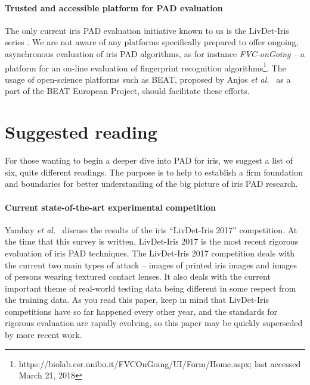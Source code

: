 \documentclass[format=acmsmall, review=false, timestamp=false]{acmart}
\newcommand{\etal}{{\it et al.}~}
\begin{document}
\paragraph{Trusted and accessible platform for PAD evaluation}

The only current iris PAD evaluation initiative known to us is the LivDet-Iris series \cite{Yambay_IJCB_2014,Yambay_ISBA_2017,Yambay_IJCB_2017}. We are not aware of any platforms specifically prepared to offer ongoing, asynchronous evaluation of iris PAD algorithms, as for instance {\it FVC-onGoing} -- a platform for an on-line evaluation of fingerprint recognition algorithms\footnote{https://biolab.csr.unibo.it/FVCOnGoing/UI/Form/Home.aspx; last accessed March 21, 2018}. The usage of open-science platforms such as BEAT, proposed by Anjos \etal \cite{Anjos_arXiv_2017} as a part of the BEAT European Project, should facilitate these efforts.

\section{Suggested reading}
\label{sec:SuggestedReading}

For those wanting to begin a deeper dive into PAD for iris, we suggest a list of six{, quite different} readings. The purpose is to help to establish a firm foundation and boundaries for better understanding of the big picture of iris PAD research.

\paragraph{Current state-of-the-art experimental competition}

Yambay \etal \cite{Yambay_IJCB_2017} discuss the results of the iris ``LivDet-Iris 2017'' competition. At the time that this survey is written, LivDet-Iris 2017 is the most recent rigorous evaluation of iris PAD techniques. The LivDet-Iris 2017 competition deals with the current two main types of attack -- images of printed iris images and images of persons wearing textured contact lenses. It also deals with the current important theme of real-world testing data being different in some respect from the training data. As you read this paper, keep in mind that LivDet-Iris competitions have so far happened every other year, and the standards for rigorous evaluation are rapidly evolving, so this paper may be quickly superseded by more recent work.
\end{document}
